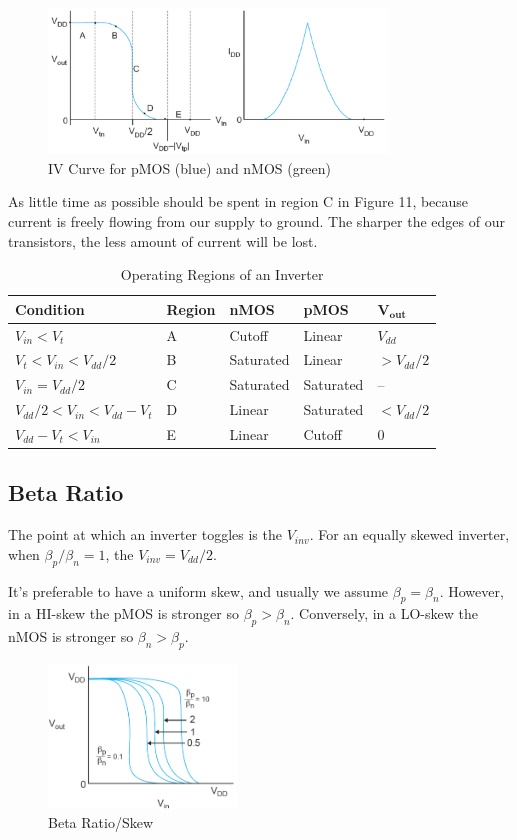 \documentclass{article}
\begin{document}
\begin{figure}[ht!]
\centering
\includegraphics[width=90mm]{IV.png}
\caption{IV Curve for pMOS (blue) and nMOS (green)}
\end{figure}

As little time as possible should be spent in region C in Figure 11, because current is freely flowing from our supply to ground. The sharper the edges of our transistors, the less amount of current will be lost.

\begin{table}[ht!]
\centering
\begin{tabular}{lllll}
\toprule
\textbf{Condition} & \textbf{Region} & \textbf{nMOS} & \textbf{pMOS} & $\mathbf{V_{out}}$ \\
\midrule
$V_{in}<V_{t}$ & A & Cutoff & Linear & $V_{dd}$ \\
$V_t < V_{in} < V_{dd}/2$ & B & Saturated & Linear & $>V_{dd}/2$ \\
$V_{in} = V_{dd}/2$ & C & Saturated & Saturated & -- \\
$V_{dd}/2 < V_{in} < V_{dd} - V_t$  & D & Linear & Saturated & $<V_{dd}/2$ \\
$V_{dd} - V_t < V_{in}$ & E & Linear & Cutoff & 0 \\
\toprule
\end{tabular}
\caption{Operating Regions of an Inverter}
\end{table}

\subsection{Beta Ratio}

The point at which an inverter toggles is the $V_{inv}$. For an equally skewed inverter, when $\beta_p/\beta_n = 1$, the $V_{inv} = V_{dd}/2$. 

It's preferable to have a uniform skew, and usually we assume $\beta_p = \beta_n$. However, in a HI-skew the pMOS is stronger so $\beta_p > \beta_n$. Conversely, in a LO-skew the nMOS is stronger so $\beta_n > \beta_p$.

\begin{figure}[ht!]
\centering
\includegraphics[width=50mm]{skew.png}
\caption{Beta Ratio/Skew}
\end{figure}
\end{document}
